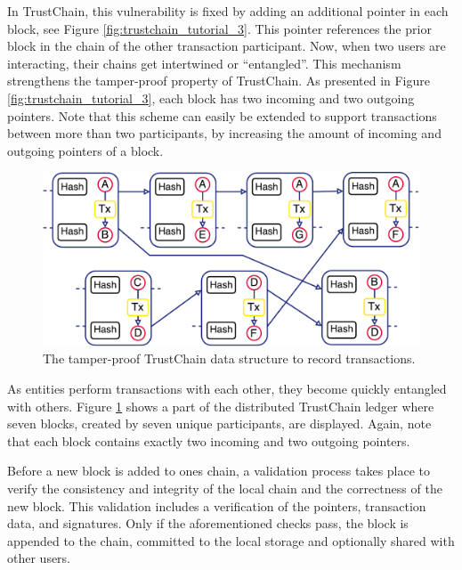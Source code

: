 \documentclass[USenglish]{article}
\begin{document}
In TrustChain, this vulnerability is fixed by adding an additional pointer in each block, see Figure \ref{fig:trustchain_tutorial_3}.
This pointer references the prior block in the chain of the other transaction participant.
Now, when two users are interacting, their chains get intertwined or \enquote{entangled}.
This mechanism strengthens the tamper-proof property of TrustChain.
As presented in Figure \ref{fig:trustchain_tutorial_3}, each block has two incoming and two outgoing pointers.
Note that this scheme can easily be extended to support transactions between more than two participants, by increasing the amount of incoming and outgoing pointers of a block.

\begin{figure}[h!]
	\centering
	\includegraphics[width=0.9\columnwidth]{assets/trustchain}
	\caption{The tamper-proof TrustChain data structure to record transactions.}
	\label{fig:trustchain}
\end{figure}

As entities perform transactions with each other, they become quickly entangled with others.
Figure \ref{fig:trustchain} shows a part of the distributed TrustChain ledger where seven blocks, created by seven unique participants, are displayed.
Again, note that each block contains exactly two incoming and two outgoing pointers.

Before a new block is added to ones chain, a validation process takes place to verify the consistency and integrity of the local chain and the correctness of the new block.
This validation includes a verification of the pointers, transaction data, and signatures.
Only if the aforementioned checks pass, the block is appended to the chain, committed to the local storage and optionally shared with other users.
\end{document}

